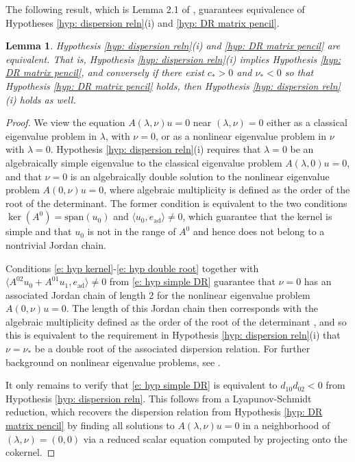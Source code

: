 \documentclass[11pt]{article}
\newcommand{\spn}{\text{\span}}
\newtheorem{lemma}[prop]{Lemma}
\numberwithin{equation}{section}
\numberwithin{prop}{section}
\renewcommand{\spn}{\mathrm{span}}
\begin{document}
The following result, which is Lemma 2.1 of \cite{AveryHolzerScheel}, guarantees equivalence of Hypotheses \ref{hyp: dispersion reln}(i) and \ref{hyp: DR matrix pencil}. 

\begin{lemma}
	Hypothesis \ref{hyp: dispersion reln}(i) and \ref{hyp: DR matrix pencil} are equivalent. That is, Hypothesis \ref{hyp: dispersion reln}(i) implies Hypothesis \ref{hyp: DR matrix pencil}, and conversely if there exist $c_* > 0$ and $\nu_* < 0$ so that Hypothesis \ref{hyp: DR matrix pencil} holds, then Hypothesis \ref{hyp: dispersion reln}(i) holds as well. 
\end{lemma}
\begin{proof}
	We view the equation $A(\lambda,\nu) u = 0$ near $(\lambda, \nu) = 0$ either as a classical eigenvalue problem in $\lambda$, with $\nu = 0$, or as a nonlinear eigenvalue problem in $\nu$ with $\lambda = 0$. Hypothesis \ref{hyp: dispersion reln}(i) requires that $\lambda = 0$ be an algebraically simple eigenvalue to the classical eigenvalue problem $A(\lambda, 0)u = 0$, and that $\nu = 0$ is an algebraically double solution to the nonlinear eigenvalue problem $A(0, \nu)u = 0$, where algebraic multiplicity is defined as the order of the root of the determinant. The former condition is equivalent to the two conditions $\ker (A^0) = \spn (u_0)$ and $\langle u_0, e_\mathrm{ad} \rangle \neq 0$, which guarantee that the kernel is simple and that $u_0$ is not in the range of $A^0$ and hence does not belong to a nontrivial Jordan chain. 
	
	Conditions \eqref{e: hyp kernel}-\eqref{e: hyp double root} together with $\langle A^{02} u_0 + A^{01} u_1, e_\mathrm{ad} \rangle \neq 0$ from \eqref{e: hyp simple DR} guarantee that $\nu = 0$ has an associated Jordan chain of length 2 for the nonlinear eigenvalue problem $A(0, \nu) u = 0$. The length of this Jordan chain then corresponds with the algebraic multiplicity defined as the order of the root of the determinant \cite{Voss}, and so this is equivalent to the requirement in Hypothesis \ref{hyp: dispersion reln}(i) that $\nu = \nu_*$ be a double root of the associated dispersion relation. For further background on nonlinear eigenvalue problems, see \cite{Voss}. 
	
	It only remains to verify that \eqref{e: hyp simple DR} is equivalent to $d_{10}d_{02} < 0$ from Hypothesis \ref{hyp: dispersion reln}. This follows from a Lyapunov-Schmidt reduction, which recovers the dispersion relation from Hypothesis \ref{hyp: DR matrix pencil} by finding all solutions to $A(\lambda, \nu) u = 0$ in a neighborhood of $(\lambda, \nu) = (0,0)$ via a reduced scalar equation computed by projecting onto the cokernel. 
\end{proof}
\end{document}
